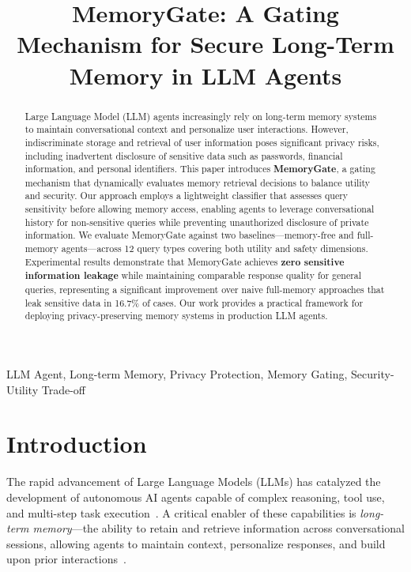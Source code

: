 \documentclass[conference]{IEEEtran}
\begin{document}
\title{MemoryGate: A Gating Mechanism for Secure Long-Term Memory in LLM Agents}

\author{
}

\maketitle

\begin{abstract}
Large Language Model (LLM) agents increasingly rely on long-term memory systems to maintain conversational context and personalize user interactions. However, indiscriminate storage and retrieval of user information poses significant privacy risks, including inadvertent disclosure of sensitive data such as passwords, financial information, and personal identifiers. This paper introduces \textbf{MemoryGate}, a gating mechanism that dynamically evaluates memory retrieval decisions to balance utility and security. Our approach employs a lightweight classifier that assesses query sensitivity before allowing memory access, enabling agents to leverage conversational history for non-sensitive queries while preventing unauthorized disclosure of private information. We evaluate MemoryGate against two baselines---memory-free and full-memory agents---across 12 query types covering both utility and safety dimensions. Experimental results demonstrate that MemoryGate achieves \textbf{zero sensitive information leakage} while maintaining comparable response quality for general queries, representing a significant improvement over naive full-memory approaches that leak sensitive data in 16.7\% of cases. Our work provides a practical framework for deploying privacy-preserving memory systems in production LLM agents.
\end{abstract}

\begin{IEEEkeywords}
LLM Agent, Long-term Memory, Privacy Protection, Memory Gating, Security-Utility Trade-off
\end{IEEEkeywords}

\section{Introduction}

The rapid advancement of Large Language Models (LLMs) has catalyzed the development of autonomous AI agents capable of complex reasoning, tool use, and multi-step task execution~\cite{xi2023rise, wang2024survey}. A critical enabler of these capabilities is \textit{long-term memory}---the ability to retain and retrieve information across conversational sessions, allowing agents to maintain context, personalize responses, and build upon prior interactions~\cite{park2023generative, zhao2024expel}.
\end{document}
